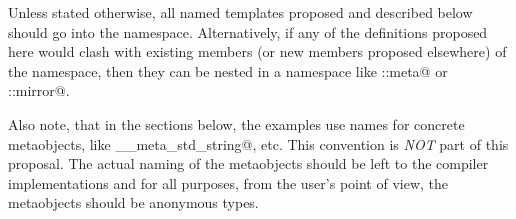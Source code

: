Unless stated otherwise, all named templates proposed and described below should
go into the \verb@std@ namespace. Alternatively, if any of the definitions
proposed here would clash with existing members (or new members proposed elsewhere)
of the \verb@std@ namespace, then they can be nested in a namespace like
\verb@std::meta@ or \verb@std::mirror@.

Also note, that in the sections below, the examples use names for concrete
metaobjects, like \verb@__meta_std_string@, etc. This convention
is {\em NOT} part of this proposal. The actual naming of the metaobjects
should be left to the compiler implementations and for all purposes,
from the user's point of view, the metaobjects should be anonymous types.



















